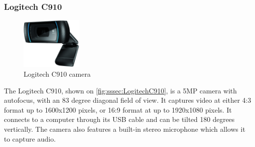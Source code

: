 \subsubsection{Logitech C910}
\begin{figure}[H]
  \centering
  \includegraphics[width=3cm]{images/techAnalysis/LogitechC910.jpg}
  \caption{Logitech C910 camera \cite{Logitech-figure-C910}}\label{fig:sssec:LogitechC910}
\end{figure}
The Logitech C910, shown on \autoref{fig:sssec:LogitechC910}, is a 5MP camera with autofocus, with an 83 degree diagonal field of view.
It captures video at either 4:3 format up to 1600x1200 pixels, or 16:9 format at up to 1920x1080 pixels.
It connects to a computer through its USB cable and can be tilted 180 degrees vertically.
The camera also features a built-in stereo microphone which allows it to capture audio.
\cite{logitech_logitech_spec}
